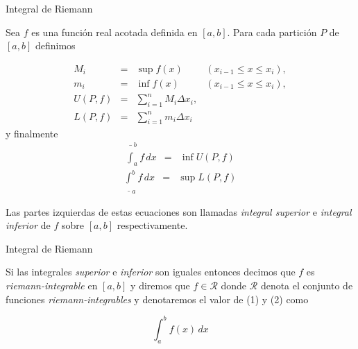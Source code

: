 \documentclass[11pt]{beamer}
\begin{document}
\begin{frame}{Integral de Riemann}

Sea $f$ es una función real acotada definida en $[a, b]$. Para cada partición $P$ de $[a, b]$ definimos

\begin{equation*}
	\begin{array}{rcll}
		M_i & = & \sup f(x) & (x_{i-1} \leq x \leq x_i), \\
		m_i & = & \inf f(x) & (x_{i-1} \leq x \leq x_i), \\
		U(P, f) & = & \sum_{i=1}^n M_i \Delta x_i , \\
		L(P, f) & = & \sum_{i=1}^n m_i \Delta x_i
	\end{array}
\end{equation*}
y finalmente
\begin{equation}
	\begin{array}{rcl}
		\bar{\int}_a^b f\,dx & = & \inf U(P, f)
	\end{array}
\end{equation}
\begin{equation}
	\begin{array}{rcl}
		\underline{\int}_a^b f\,dx & = & \sup L(P, f)
	\end{array}
\end{equation}

Las partes izquierdas de estas ecuaciones son llamadas \textit{integral superior} e \textit{integral inferior} de $f$ sobre $[a, b]$ respectivamente.

\end{frame}

\begin{frame}{Integral de Riemann}

Si las integrales \textit{superior} e \textit{inferior} son iguales entonces decimos que $f$ es \textit{riemann-integrable} en $[a, b]$ y diremos que $f\in \mathcal{R}$ donde $\mathcal{R}$ denota el conjunto de funciones \textit{riemann-integrables} y denotaremos el valor de (1) y (2) como

\begin{equation}
	\int_a^b f(x)\,dx
\end{equation}

\end{frame}
\end{document}
